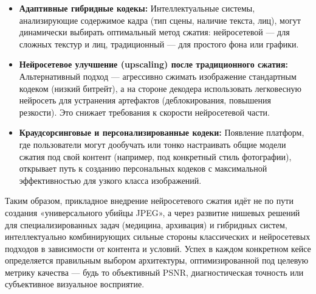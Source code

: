 \begin{itemize}
\item \textbf{Адаптивные гибридные кодекы:} Интеллектуальные системы, анализирующие содержимое кадра (тип сцены, наличие текста, лиц), могут динамически выбирать оптимальный метод сжатия: нейросетевой — для сложных текстур и лиц, традиционный — для простого фона или графики.
\item \textbf{Нейросетевое улучшение (upscaling) после традиционного сжатия:} Альтернативный подход — агрессивно сжимать изображение стандартным кодеком (низкий битрейт), а на стороне декодера использовать легковесную нейросеть для устранения артефактов (деблокирования, повышения резкости). Это снижает требования к скорости нейросетевой части.
\item \textbf{Краудсорсинговые и персонализированные кодеки:} Появление платформ, где пользователи могут дообучать или тонко настраивать общие модели сжатия под свой контент (например, под конкретный стиль фотографии), открывает путь к созданию персональных кодеков с максимальной эффективностью для узкого класса изображений.
\end{itemize}

Таким образом, прикладное внедрение нейросетевого сжатия идёт не по пути создания «универсального убийцы JPEG», а через развитие нишевых решений для специализированных задач (медицина, архивация) и гибридных систем, интеллектуально комбинирующих сильные стороны классических и нейросетевых подходов в зависимости от контента и условий. Успех в каждом конкретном кейсе определяется правильным выбором архитектуры, оптимизированной под целевую метрику качества — будь то объективный PSNR, диагностическая точность или субъективное визуальное восприятие.